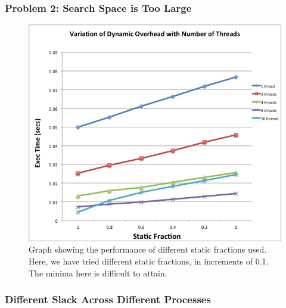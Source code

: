 {%
\begin{frame}
\frametitle{Problem 2: Search Space is Too Large}
\begin{figure}
\includegraphics[scale=0.20]{./plots/vary-sf-for-diff-threads}
\caption{Graph showing the performance of different static fractions used. Here, we have tried different static
fractions, in increments of 0.1. The minima here is difficult to attain.}
\end{figure}
\end{frame}

\begin{frame}
\frametitle{Different Slack Across Different Processes}
\vspace*{-0.3in}


\end{frame}}
